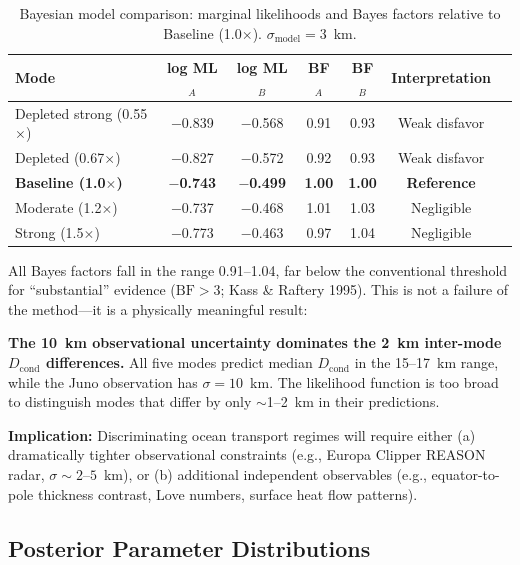 \documentclass[11pt,letterpaper]{article}
\begin{document}
\begin{table}[htbp]
\centering
\caption{Bayesian model comparison: marginal likelihoods and Bayes factors relative to Baseline (1.0$\times$). $\sigma_\mathrm{model} = 3$~km.}
\label{tab:bayes}
\begin{tabular}{@{}lcccccc@{}}
\toprule
\textbf{Mode} & \textbf{log ML$_A$} & \textbf{log ML$_B$} & \textbf{BF$_A$} & \textbf{BF$_B$} & \textbf{Interpretation} \\
\midrule
Depleted strong (0.55$\times$) & $-$0.839 & $-$0.568 & 0.91 & 0.93 & Weak disfavor \\
Depleted (0.67$\times$) & $-$0.827 & $-$0.572 & 0.92 & 0.93 & Weak disfavor \\
\textbf{Baseline (1.0$\times$)} & \textbf{$-$0.743} & \textbf{$-$0.499} & \textbf{1.00} & \textbf{1.00} & \textbf{Reference} \\
Moderate (1.2$\times$) & $-$0.737 & $-$0.468 & 1.01 & 1.03 & Negligible \\
Strong (1.5$\times$) & $-$0.773 & $-$0.463 & 0.97 & 1.04 & Negligible \\
\bottomrule
\end{tabular}
\end{table}

\begin{critiquebox}
All Bayes factors fall in the range 0.91--1.04, far below the conventional threshold for ``substantial'' evidence ($\mathrm{BF} > 3$; Kass \& Raftery 1995). This is not a failure of the method---it is a physically meaningful result:

\textbf{The 10~km observational uncertainty dominates the 2~km inter-mode $D_\mathrm{cond}$ differences.} All five modes predict median $D_\mathrm{cond}$ in the 15--17~km range, while the Juno observation has $\sigma = 10$~km. The likelihood function is too broad to distinguish modes that differ by only $\sim$1--2~km in their predictions.

\textbf{Implication:} Discriminating ocean transport regimes will require either (a) dramatically tighter observational constraints (e.g., Europa Clipper REASON radar, $\sigma \sim 2$--$5$~km), or (b) additional independent observables (e.g., equator-to-pole thickness contrast, Love numbers, surface heat flow patterns).
\end{critiquebox}

\subsection{Posterior Parameter Distributions}
\end{document}
